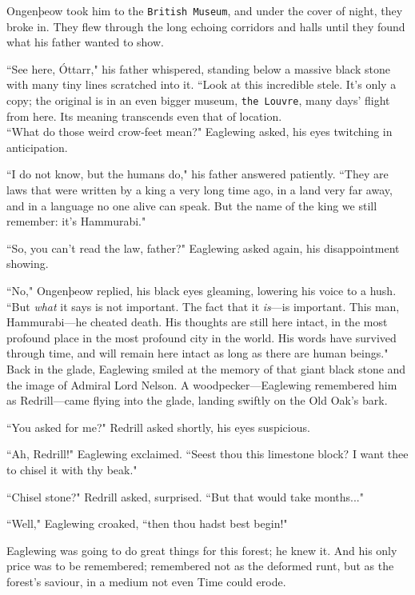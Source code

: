 Ongenþeow took him to the \texttt{British Museum}, and under the cover of night, they broke in.
They flew through the long echoing corridors and halls until they found what his father wanted to show.

``See here, Óttarr," his father whispered, standing below a massive black stone with many tiny lines scratched into it.
``Look at this incredible stele.
It's only a copy; the original is in an even bigger museum, \texttt{the Louvre}, many days' flight from here.
Its meaning transcends even that of location.\\



``What do those weird crow-feet mean?" Eaglewing asked, his eyes twitching in anticipation.

``I do not know, but the humans do," his father answered patiently.
``They are laws that were written by a king a very long time ago, in a land very far away, and in a language no one alive can speak.
But the name of the king we still remember: it's Hammurabi."

``So, you can't read the law, father?" Eaglewing asked again, his disappointment showing.

``No," Ongenþeow replied, his black eyes gleaming, lowering his voice to a hush.
``But \textit{what} it says is not important.
The fact that it \textit{is}---is important.
This man, Hammurabi---he cheated death.
His thoughts are still here intact, in the most profound place in the most profound city in the world.
His words have survived through time, and will remain here intact as long as there are human beings."\\

Back in the glade, Eaglewing smiled at the memory of that giant black stone and the image of Admiral Lord Nelson.
A woodpecker---Eaglewing remembered him as Redrill---came flying into the glade, landing swiftly on the Old Oak's bark.

``You asked for me?" Redrill asked shortly, his eyes suspicious.

``Ah, Redrill!" Eaglewing exclaimed. ``Seest thou this limestone block? I want thee to chisel it with thy beak."

``Chisel stone?" Redrill asked, surprised.
``But that would take months..."

``Well," Eaglewing croaked, ``then thou hadst best begin!"

Eaglewing was going to do great things for this forest; he knew it.
And his only price was to be remembered; remembered not as the deformed runt, but as the forest's saviour, in a medium not even Time could erode.
